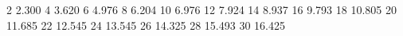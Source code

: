 2  2.300
4  3.620
6  4.976
8  6.204
10 6.976
12 7.924
14 8.937
16 9.793
18 10.805
20 11.685
22 12.545
24 13.545
26 14.325
28 15.493
30 16.425
